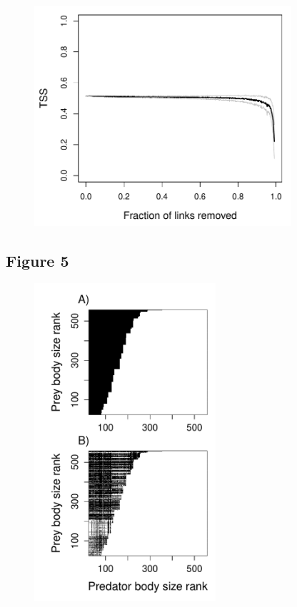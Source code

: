 \documentclass[12pt]{article}
\begin{document}
\begin{figure}[ht!]
	\centering\includegraphics[width=0.85\textwidth]{TSS_sampling.pdf}
\end{figure}

\newpage
\subsection*{Figure 5}

\begin{figure}[ht!]
	\centering\includegraphics[width=0.6\textwidth]{Example_MED.pdf}
\end{figure}
\end{document}
